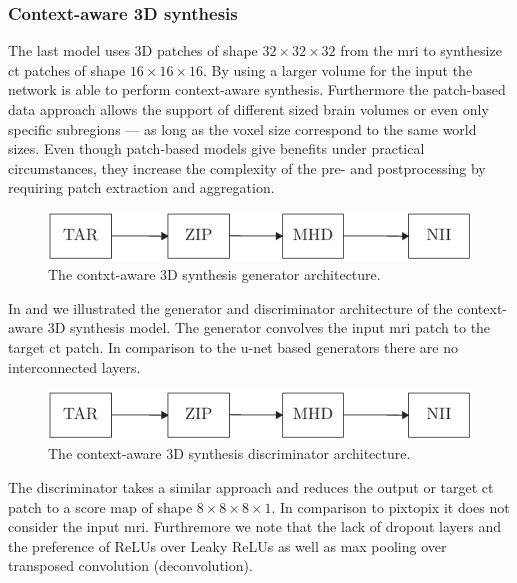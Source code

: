 \subsubsection{Context-aware 3D synthesis}

The last model uses 3D patches of shape $32\times32\times32$ from the
\gls{mri} to synthesize \gls{ct} patches of shape $16\times16\times16$. By
using a larger volume for the input the network is able to perform
context-aware synthesis. Furthermore the patch-based data approach allows the
support of different sized brain volumes or even only specific subregions ---
as long as the voxel size correspond to the same world sizes. Even though
patch-based models give benefits under practical circumstances, they increase
the complexity of the pre- and postprocessing by requiring patch extraction
and aggregation.
\begin{figure}[h]
  \centering
  \includegraphics[page=5,width=.8\linewidth]{figure/diagrams.pdf}
  \caption{The contxt-aware 3D synthesis generator architecture.
  }\label{fig:synthesis:gen}
\end{figure}
In  and  we illustrated the
generator and discriminator architecture of the context-aware 3D synthesis
model. The generator convolves the input \gls{mri} patch to the target
\gls{ct} patch. In comparison to the u-net based generators there are no
interconnected layers.
\begin{figure}[h]
  \centering
  \includegraphics[page=6,width=.8\linewidth]{figure/diagrams.pdf}
  \caption{The context-aware 3D synthesis discriminator architecture.
	}\label{fig:synthesis:disc}
\end{figure}
The discriminator takes a similar approach and reduces the output or target
\gls{ct} patch to a score map of shape $8\times8\times8\times1$. In comparison
to pixtopix it does not consider the input \gls{mri}. Furthremore we note that
the lack of dropout layers and the preference of ReLUs over Leaky ReLUs as
well as max pooling over transposed convolution (deconvolution).
